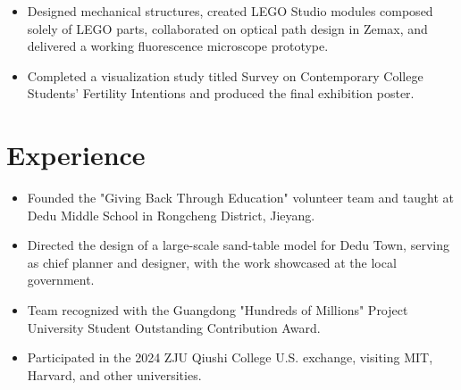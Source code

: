 \documentclass{resume}
\begin{document}
\begin{itemize}[parsep=0.5ex]
  \item Designed mechanical structures, created LEGO Studio modules composed solely of LEGO parts, collaborated on optical path design in Zemax, and delivered a working fluorescence microscope prototype.
\end{itemize}

\begin{itemize}[parsep=0.5ex]
  \item Completed a visualization study titled Survey on Contemporary College Students' Fertility Intentions and produced the final exhibition poster.
\end{itemize}

\section{Experience}

\begin{itemize}[parsep=0.5ex]
 \item Founded the "Giving Back Through Education" volunteer team and taught at Dedu Middle School in Rongcheng District, Jieyang.
 \item Directed the design of a large-scale sand-table model for Dedu Town, serving as chief planner and designer, with the work showcased at the local government.
 \item Team recognized with the Guangdong "Hundreds of Millions" Project University Student Outstanding Contribution Award.
\end{itemize}


\begin{itemize}[parsep=0.5ex]
\item Participated in the 2024 ZJU Qiushi College U.S. exchange, visiting MIT, Harvard, and other universities.
\end{itemize}
\end{document}
